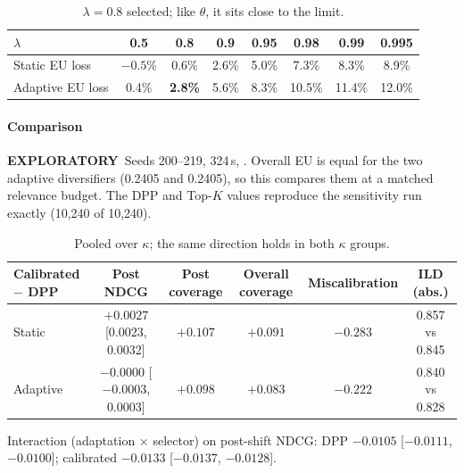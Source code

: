 \documentclass[11pt,a4paper]{article}
\newcommand{\statustag}[2]{\colorbox{#1}{\scriptsize\sffamily\bfseries #2}}
\newcommand{\exploratory}{\statustag{orange!20}{EXPLORATORY}}
\begin{document}
\begin{table}[h]\centering\small
\begin{tabular}{lccccccc}
\toprule
$\lambda$ & 0.5 & \textbf{0.8} & 0.9 & 0.95 & 0.98 & 0.99 & 0.995 \\
\midrule
Static EU loss & $-0.5\%$ & 0.6\% & 2.6\% & 5.0\% & 7.3\% & 8.3\% & 8.9\% \\
Adaptive EU loss & 0.4\% & \textbf{2.8\%} & 5.6\% & 8.3\% & 10.5\% & 11.4\% & 12.0\% \\
\bottomrule
\end{tabular}
\caption{$\lambda=0.8$ selected; like $\theta$, it sits close to the limit.}
\end{table}

\paragraph{Comparison} \exploratory\ Seeds 200--219, 324\,s,
. Overall EU is equal for the two adaptive
diversifiers (0.2405 and 0.2405), so this compares them at a matched relevance budget. The DPP and
Top-$K$ values reproduce the sensitivity run exactly (10{,}240 of 10{,}240).

\begin{table}[h]\centering\small
\begin{tabular}{lccccc}
\toprule
Calibrated $-$ DPP & Post NDCG & Post coverage & Overall coverage & Miscalibration & ILD (abs.) \\
\midrule
Static & $+0.0027$ [0.0023, 0.0032] & $+0.107$ & $+0.091$ & $-0.283$ & 0.857 vs 0.845 \\
Adaptive & $-0.0000$ [$-0.0003$, 0.0003] & $+0.098$ & $+0.083$ & $-0.222$ & 0.840 vs 0.828 \\
\bottomrule
\end{tabular}
\caption{Pooled over $\kappa$; the same direction holds in both $\kappa$ groups.}
\end{table}

\noindent Interaction (adaptation $\times$ selector) on post-shift NDCG: DPP $-0.0105$
[$-0.0111$, $-0.0100$]; calibrated $-0.0133$ [$-0.0137$, $-0.0128$].
\end{document}
